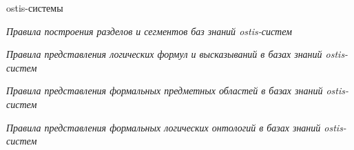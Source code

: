 \begin{SCn}
\begin{scnstruct}
\begin{scneqtovector}
{\begin{scnitemize}
                        ostis-системы
                        \item \textit{Правила построения разделов и сегментов
                            баз знаний ostis-систем}
                        \item \textit{Правила представления логических формул и высказываний в базах знаний ostis-систем}
                        \item \textit{Правила представления формальных предметных областей в базах знаний ostis-систем}
                        \item \textit{Правила представления формальных логических онтологий в базах знаний ostis-систем}
                    \end{scnitemize}
        }
	\end{scneqtovector}



\end{scnstruct}
\end{SCn}
